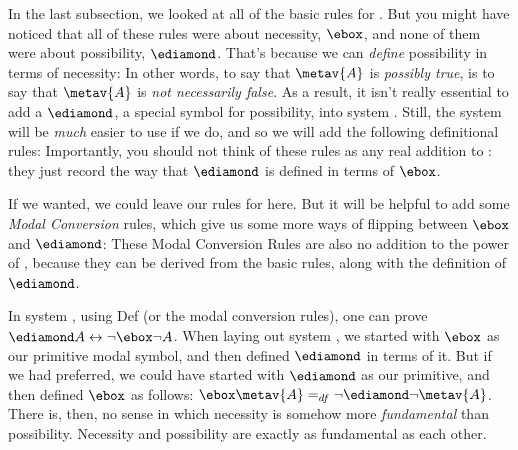 In the last subsection, we looked at all of the basic rules for \mlK. But you might have noticed that all of these rules were about necessity, $\ebox$, and none of them were about possibility, $\ediamond$. That's because we can \emph{define} possibility in terms of necessity:
In other words, to say that $\metav{A}$ is \emph{possibly true}, is to say that $\metav{A}$ is \emph{not necessarily false}. As a result, it isn't really essential to add a $\ediamond$, a special symbol for possibility, into system \mlK. Still, the system will be \emph{much} easier to use if we do, and so we will add the following definitional rules:
Importantly, you should not think of these rules as any real addition to \mlK: they just record the way that $\ediamond$ is defined in terms of $\ebox$.

If we wanted, we could leave our rules for \mlK{} here. But it will be helpful to add some \emph{Modal Conversion} rules, which give us some more ways of flipping between $\ebox$ and $\ediamond$:
These Modal Conversion Rules are also no addition to the power of \mlK, because they can be derived from the basic rules, along with the definition of $\ediamond$.

In system \mlK, using Def\ediamond{} (or the modal conversion rules), one can prove $\ediamond A \eiff \enot\ebox\enot A$. When laying out system \mlK, we started with $\ebox$ as our primitive modal symbol, and then defined $\ediamond$ in terms of it. But if we had preferred, we could have started with $\ediamond$ as our primitive, and then defined $\ebox$ as follows: $\ebox\metav{A} =_{df} \enot \ediamond \enot \metav{A}$. There is, then, no sense in which necessity is somehow more \emph{fundamental} than possibility. Necessity and possibility are exactly as fundamental as each other.


